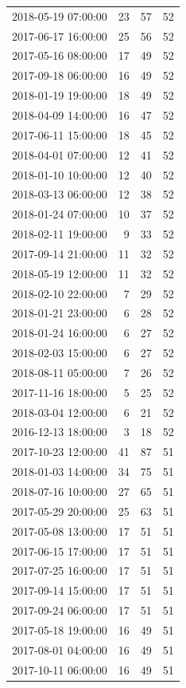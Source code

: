 \begin{tabular}{lrrr}
2018-05-19 07:00:00 & 23 & 57 & 52 \\
2017-06-17 16:00:00 & 25 & 56 & 52 \\
2017-05-16 08:00:00 & 17 & 49 & 52 \\
2017-09-18 06:00:00 & 16 & 49 & 52 \\
2018-01-19 19:00:00 & 18 & 49 & 52 \\
2018-04-09 14:00:00 & 16 & 47 & 52 \\
2017-06-11 15:00:00 & 18 & 45 & 52 \\
2018-04-01 07:00:00 & 12 & 41 & 52 \\
2018-01-10 10:00:00 & 12 & 40 & 52 \\
2018-03-13 06:00:00 & 12 & 38 & 52 \\
2018-01-24 07:00:00 & 10 & 37 & 52 \\
2018-02-11 19:00:00 & 9 & 33 & 52 \\
2017-09-14 21:00:00 & 11 & 32 & 52 \\
2018-05-19 12:00:00 & 11 & 32 & 52 \\
2018-02-10 22:00:00 & 7 & 29 & 52 \\
2018-01-21 23:00:00 & 6 & 28 & 52 \\
2018-01-24 16:00:00 & 6 & 27 & 52 \\
2018-02-03 15:00:00 & 6 & 27 & 52 \\
2018-08-11 05:00:00 & 7 & 26 & 52 \\
2017-11-16 18:00:00 & 5 & 25 & 52 \\
2018-03-04 12:00:00 & 6 & 21 & 52 \\
2016-12-13 18:00:00 & 3 & 18 & 52 \\
2017-10-23 12:00:00 & 41 & 87 & 51 \\
2018-01-03 14:00:00 & 34 & 75 & 51 \\
2018-07-16 10:00:00 & 27 & 65 & 51 \\
2017-05-29 20:00:00 & 25 & 63 & 51 \\
2017-05-08 13:00:00 & 17 & 51 & 51 \\
2017-06-15 17:00:00 & 17 & 51 & 51 \\
2017-07-25 16:00:00 & 17 & 51 & 51 \\
2017-09-14 15:00:00 & 17 & 51 & 51 \\
2017-09-24 06:00:00 & 17 & 51 & 51 \\
2017-05-18 19:00:00 & 16 & 49 & 51 \\
2017-08-01 04:00:00 & 16 & 49 & 51 \\
2017-10-11 06:00:00 & 16 & 49 & 51 \\

\end{tabular}

